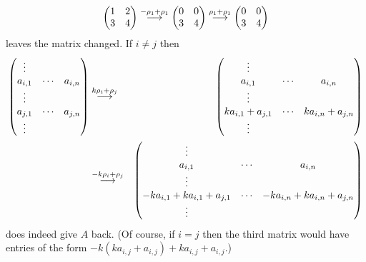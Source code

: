 \begin{exercises}
\begin{answer}
\begin{exparts}
\begin{equation*}
\begin{pmatrix}
            1  &2  \\
            3  &4  
          \end{pmatrix}
          \mathrel{ \mathop{\longrightarrow}\limits^{-\rho_1+\rho_1\mathstrut}_{ \begin{subarray}{l} \relax \end{subarray}}}
          \begin{pmatrix}
            0  &0  \\
            3  &4  
          \end{pmatrix}
          \mathrel{ \mathop{\longrightarrow}\limits^{\rho_1+\rho_1\mathstrut}_{ \begin{subarray}{l} \relax \end{subarray}}}
          \begin{pmatrix}
            0  &0  \\
            3  &4  
          \end{pmatrix}
        \end{equation*}
        leaves the matrix changed.
      \partsitem If $i\neq j$ then
        \begin{eqnarray*}
          \begin{pmatrix}
            \vdots                     \\
            a_{i,1}  &\cdots  &a_{i,n}  \\
            \vdots                     \\
            a_{j,1}  &\cdots  &a_{j,n}  \\
            \vdots                     
          \end{pmatrix}
          &\mathrel{ \mathop{\longrightarrow}\limits^{k\rho_i+\rho_j\mathstrut}_{ \begin{subarray}{l} \relax \end{subarray}}}
          &\begin{pmatrix}
            \vdots                                      \\
            a_{i,1}           &\cdots  &a_{i,n}          \\
            \vdots                                      \\
            ka_{i,1}+a_{j,1}  &\cdots  &ka_{i,n}+a_{j,n}  \\
            \vdots                     
          \end{pmatrix}                                        \\
          &\mathrel{ \mathop{\longrightarrow}\limits^{-k\rho_i+\rho_j\mathstrut}_{ \begin{subarray}{l} \relax \end{subarray}}}
          &\begin{pmatrix}
            \vdots                                      \\
            a_{i,1}           &\cdots  &a_{i,n}          \\
            \vdots                                      \\
            -ka_{i,1}+ka_{i,1}+a_{j,1}  &\cdots &-ka_{i,n}+ka_{i,n}+a_{j,n} \\
            \vdots                     
          \end{pmatrix}
        \end{eqnarray*}
        does indeed give $A$ back.
        (Of course, if $i=j$ then the third matrix would have entries of the 
        form $-k(ka_{i,j}+a_{i,j})+ka_{i,j}+a_{i,j}$.)
    \end{exparts}
   \end{answer}
\end{exercises}
